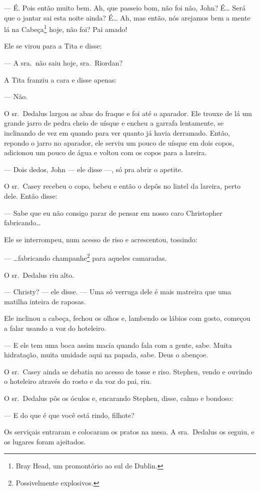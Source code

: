 --- É. Pois então muito bem. Ah, que passeio bom, não foi não, John? É\ldots{}
Será que o jantar sai esta noite ainda? É\ldots{} Ah, mas então, nós
arejamos bem a mente lá na Cabeça\footnote{ Bray Head, um promontório
ao sul de Dublin.} hoje, não foi? Pai amado!

Ele se virou para a Tita e disse:

 --- A sra.~não saiu hoje, sra.~Riordan?

A Tita franziu a cara e disse apenas:

 --- Não.

O sr.~Dedalus largou as abas do fraque e foi até o aparador. Ele trouxe
de lá um grande jarro de pedra cheio de uísque e encheu a garrafa
lentamente, se inclinando de vez em quando para ver quanto já havia
derramado. Então, repondo o jarro no aparador, ele serviu um pouco de
uísque em dois copos, adicionou um pouco de água e voltou com os copos
para a lareira.

 --- Dois dedos, John --- ele disse ---, só pra abrir o apetite.

O sr.~Casey recebeu o copo, bebeu e então o depôs no lintel da lareira,
perto dele. Então disse:

 --- Sabe que eu não consigo parar de pensar em nosso caro Christopher
fabricando\ldots{}

Ele se interrompeu, num acesso de riso e acrescentou, tossindo:

 --- \ldots{}fabricando champanhe\footnote{ Possivelmente explosivos.}
para aqueles camaradas.

O sr.~Dedalus riu alto.

 --- Christy? --- ele disse. --- Uma só verruga dele é mais matreira que uma matilha inteira de raposas.

Ele inclinou a cabeça, fechou os olhos e, lambendo os lábios com gosto,
começou a falar usando a voz do hoteleiro.

 --- E ele tem uma boca assim macia quando fala com a gente, sabe. Muita
hidratação, muita umidade aqui na papada, sabe. Deus o abençoe.

O sr.~Casey ainda se debatia no acesso de tosse e riso. Stephen, vendo e
ouvindo o hoteleiro através do rosto e da voz do pai, riu.

O sr.~Dedalus pôs os óculos e, encarando Stephen, disse, calmo e
bondoso:

 --- E do que é que você está rindo, filhote?

Os serviçais entraram e colocaram os pratos na mesa. A sra.~Dedalus os
seguiu, e os lugares foram ajeitados.

